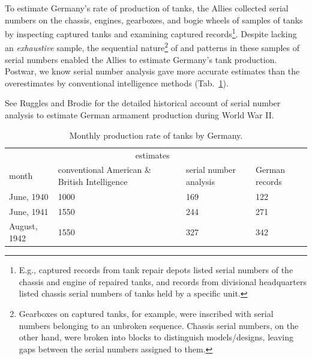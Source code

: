 \documentclass[11pt, oneside]{article}
\begin{document}
To estimate Germany's rate of production of tanks, the Allies collected serial numbers on the chassis, engines, gearboxes, and bogie wheels of samples of tanks by inspecting captured tanks and examining captured records\footnote{E.g., captured records from tank repair depots listed serial numbers of the chassis and engine of repaired tanks, and records from divisional headquarters listed chassis serial numbers of tanks held by a specific unit.}. 
Despite lacking an \emph{exhaustive} sample, the sequential nature\footnote{
Gearboxes on captured tanks, for example, were inscribed with serial numbers belonging to an unbroken sequence. Chassis serial numbers, on the other hand, were broken into blocks to distinguish models/designs, leaving gaps between the serial numbers assigned to them.
} of and patterns in these samples of serial numbers enabled the Allies to estimate Germany's tank production. Postwar, we know serial number analysis gave more accurate estimates than the overestimates by conventional intelligence methods (Tab.~\ref{tab:success}).

See Ruggles and Brodie \cite{ruggles1947empirical} for the detailed historical account of serial number analysis to estimate German armament production during World War II.


\begin{table}[h!]
\centering 
\caption{Monthly production rate of tanks by Germany. \cite{ruggles1947empirical}} \label{tab:success}
\begin{tabular}{p{2.5cm} p{4cm} p{4cm} p{2cm}}
\toprule
 & \multicolumn{2}{c}{estimates} &   \\ 
\cmidrule(r){2-3}
month & conventional American \& British Intelligence & serial number analysis  & German records \\
\midrule
June, 1940 & 1000& 169 &  122 \\
June, 1941 &1550 & 244 &   271 \\
August, 1942 & 1550& 327  & 342 \\
\bottomrule
\end{tabular}
\end{table}
\end{document}
